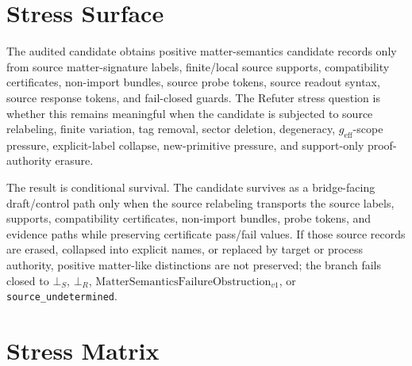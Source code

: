 \documentclass[11pt]{article}
\newcommand{\geff}{g_{\mathrm{eff}}}
\newcommand{\FailureObs}{\mathrm{MatterSemanticsFailureObstruction}_{v1}}
\newcommand{\BottomS}{\bot_S}
\newcommand{\BottomR}{\bot_R}
\begin{document}
\section{Stress Surface}

The audited candidate obtains positive matter-semantics candidate records only
from source matter-signature labels, finite/local source supports,
compatibility certificates, non-import bundles, source probe tokens, source
readout syntax, source response tokens, and fail-closed guards. The Refuter
stress question is whether this remains meaningful when the candidate is
subjected to source relabeling, finite variation, tag removal, sector deletion,
degeneracy, \(\geff\)-scope pressure, explicit-label collapse, new-primitive
pressure, and support-only proof-authority erasure.

The result is conditional survival. The candidate survives as a
bridge-facing draft/control path only when the source relabeling transports the
source labels, supports, compatibility certificates, non-import bundles, probe
tokens, and evidence paths while preserving certificate pass/fail values. If
those source records are erased, collapsed into explicit names, or replaced by
target or process authority, positive matter-like distinctions are not
preserved; the branch fails closed to \(\BottomS\), \(\BottomR\),
\(\FailureObs\), or \texttt{source\_undetermined}.

\section{Stress Matrix}
\end{document}
